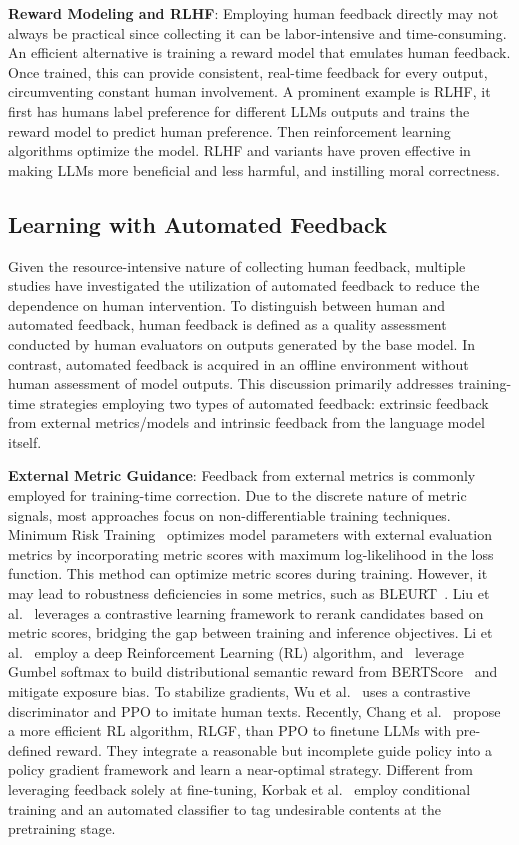 \documentclass[a4paper,oneside]{book}
\begin{document}
\textbf{Reward Modeling and RLHF}: Employing human feedback directly may not always be practical since collecting it can be labor-intensive and time-consuming. An efficient alternative is training a reward model that emulates human feedback. Once trained, this can provide consistent, real-time feedback for every output, circumventing constant human involvement. A prominent example is RLHF, it first has humans label preference for different LLMs outputs and trains the reward model to predict human preference. Then reinforcement learning algorithms optimize the model. RLHF and variants have proven effective in making LLMs more beneficial and less harmful, and instilling moral correctness.

\subsection{Learning with Automated Feedback}
Given the resource-intensive nature of collecting human feedback, multiple studies have investigated the utilization of automated feedback to reduce the dependence on human intervention. To distinguish between human and automated feedback, human feedback is defined as a quality assessment conducted by human evaluators on outputs generated by the base model. In contrast, automated feedback is acquired in an offline environment without human assessment of model outputs. This discussion primarily addresses training-time strategies employing two types of automated feedback: extrinsic feedback from external metrics/models and intrinsic feedback from the language model itself.

\textbf{External Metric Guidance}: Feedback from external metrics is commonly employed for training-time correction. Due to the discrete nature of metric signals, most approaches focus on non-differentiable training techniques. Minimum Risk Training~\cite{shen2015minimum} optimizes model parameters with external evaluation metrics by incorporating metric scores with maximum log-likelihood in the loss function. This method can optimize metric scores during training. However, it may lead to robustness deficiencies in some metrics, such as BLEURT~\cite{sellam2020bleurt}. Liu et al.~\cite{liu2021simcls} leverages a contrastive learning framework to rerank candidates based on metric scores, bridging the gap between training and inference objectives. Li et al.~\cite{li2019deep} employ a deep Reinforcement Learning (RL) algorithm, and~\cite{unanue2021berttune} leverage Gumbel softmax to build distributional semantic reward from BERTScore~\cite{zhang2020bertscore} and mitigate exposure bias. To stabilize gradients, Wu et al.~\cite{wu2021textgail} uses a contrastive discriminator and PPO to imitate human texts. Recently, Chang et al.~\cite{chang2023learning} propose a more efficient RL algorithm, RLGF, than PPO to finetune LLMs with pre-defined reward. They integrate a reasonable but incomplete guide policy into a policy gradient framework and learn a near-optimal strategy. Different from leveraging feedback solely at fine-tuning, Korbak et al.~\cite{korbak2023pretraining} employ conditional training and an automated classifier to tag undesirable contents at the pretraining stage.
\end{document}
